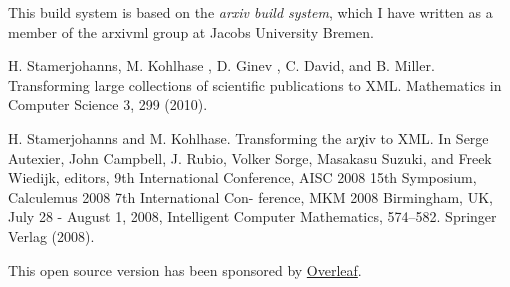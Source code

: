 \documentclass[a4paper]{article}
\begin{document}
This build system is based on the \textit{arxiv build system}, which I have written
as a member of the arxivml group at Jacobs University Bremen.

H. Stamerjohanns, M. Kohlhase , D. Ginev , C. David, and B. Miller. Transforming large collections of scientific publications to XML. Mathematics in Computer Science 3, 299 (2010).

H. Stamerjohanns and M. Kohlhase. Transforming the arχiv to XML.
In Serge Autexier, John Campbell, J. Rubio, Volker Sorge, Masakasu
Suzuki, and Freek Wiedijk, editors, 9th International Conference,
AISC 2008 15th Symposium, Calculemus 2008 7th International Con-
ference, MKM 2008 Birmingham, UK, July 28 - August 1, 2008, Intelligent Computer Mathematics, 574–582. Springer Verlag (2008).

This open source version has been sponsored by 
\href{https://www.overleaf.com}{Overleaf}.
\end{document}
